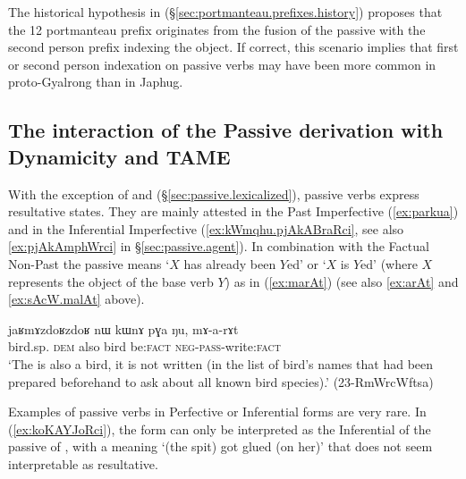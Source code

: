 The historical hypothesis in (§\ref{sec:portmanteau.prefixes.history}) proposes that the 1\fl{}2 portmanteau prefix  originates from the fusion of  the passive  with the second person  prefix indexing the object. If correct, this scenario implies that first or second person indexation on passive verbs may have been more common in proto-Gyalrong than in Japhug.

\subsection{The interaction of the Passive derivation with Dynamicity and TAME} \label{sec:passive.stative} 

With the exception of   and   (§\ref{sec:passive.lexicalized}), passive verbs express resultative states. They are mainly attested in the Past Imperfective (\ref{ex:parkua}) and in the Inferential Imperfective (\ref{ex:kWmqhu.pjAkABraRci}, see also \ref{ex:pjAkAmphWrci} in §\ref{sec:passive.agent}). In combination with the Factual Non-Past the passive means `$X$ has already been $Y$ed' or `$X$ is $Y$ed' (where $X$ represents the object of the base verb $Y$) as in (\ref{ex:marAt}) (see also \ref{ex:arAt} and \ref{ex:sAcW.malAt} above).

\begin{exe}
\ex \label{ex:marAt}
 \gll  jaʁmɤzdoʁzdoʁ nɯ kɯnɤ pɣa ŋu, mɤ-a-rɤt \\
 bird.sp. \textsc{dem} also bird be:\textsc{fact} \textsc{neg}-\textsc{pass}-write:\textsc{fact} \\
 \glt `The  is also a bird, it is not written (in the list of bird's names that had been prepared beforehand to ask about all known bird species).' (23-RmWrcWftsa) 
\end{exe}

 Examples of passive verbs in Perfective or Inferential forms are very rare. In (\ref{ex:koKAYJoRci}), the form  can only be interpreted as the Inferential of the passive of , with a meaning `(the spit) got glued (on her)' that does not seem interpretable as resultative.
 
